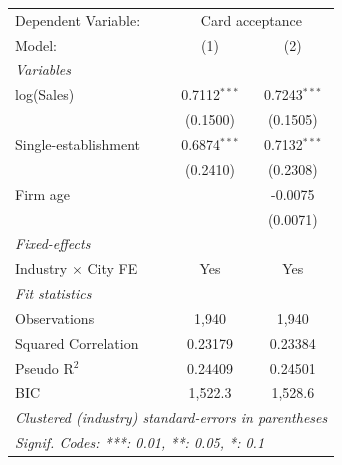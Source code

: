 \begingroup
\centering
\begin{tabular}{lcc}
   \tabularnewline \midrule \midrule
   Dependent Variable: & \multicolumn{2}{c}{Card acceptance}\\
   Model:                     & (1)            & (2)\\  
   \midrule
   \emph{Variables}\\
   log(Sales)                 & 0.7112$^{***}$ & 0.7243$^{***}$\\   
                              & (0.1500)       & (0.1505)\\   
   Single-establishment       & 0.6874$^{***}$ & 0.7132$^{***}$\\   
                              & (0.2410)       & (0.2308)\\   
   Firm age                   &                & -0.0075\\   
                              &                & (0.0071)\\   
   \midrule
   \emph{Fixed-effects}\\
   Industry $\times$ City FE  & Yes            & Yes\\  
   \midrule
   \emph{Fit statistics}\\
   Observations               & 1,940          & 1,940\\  
   Squared Correlation        & 0.23179        & 0.23384\\  
   Pseudo R$^2$               & 0.24409        & 0.24501\\  
   BIC                        & 1,522.3        & 1,528.6\\  
   \midrule \midrule
   \multicolumn{3}{l}{\emph{Clustered (industry) standard-errors in parentheses}}\\
   \multicolumn{3}{l}{\emph{Signif. Codes: ***: 0.01, **: 0.05, *: 0.1}}\\
\end{tabular}
\par\endgroup
